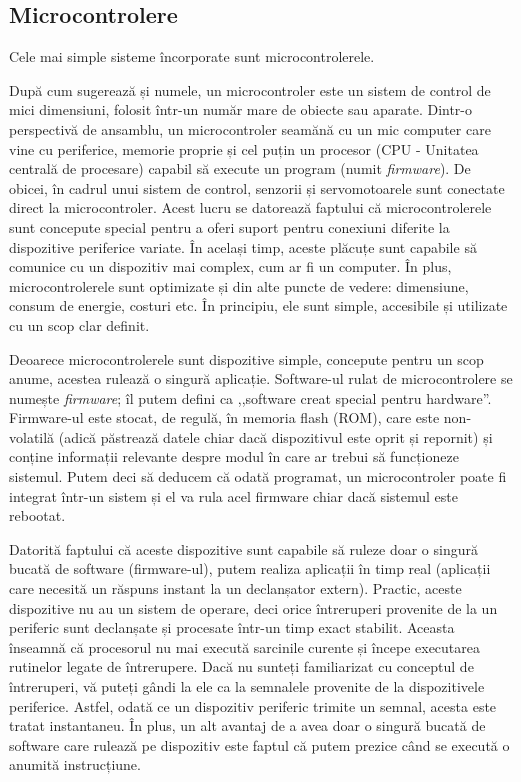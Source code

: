 \subsection{Microcontrolere}
\label{sec:embed:micro-comp:micro}

Cele mai simple sisteme încorporate sunt microcontrolerele.

După cum sugerează și numele, un microcontroler este un sistem de control de
mici dimensiuni, folosit într-un număr mare de obiecte sau aparate. Dintr-o
perspectivă de ansamblu, un microcontroler seamănă cu un mic computer care vine
cu periferice, memorie proprie și cel puțin un procesor (CPU - Unitatea centrală
de procesare) capabil să execute un program (numit \textit{firmware}). De obicei, în
cadrul unui sistem de control, senzorii și servomotoarele sunt conectate direct
la microcontroler. Acest lucru se datorează faptului că microcontrolerele sunt
concepute special pentru a oferi suport pentru conexiuni diferite la dispozitive
periferice variate. În același timp, aceste plăcuțe sunt capabile să comunice cu
un dispozitiv mai complex, cum ar fi un computer. În plus, microcontrolerele
sunt optimizate și din alte puncte de vedere: dimensiune, consum de energie,
costuri etc. În principiu, ele sunt simple, accesibile și utilizate cu un scop
clar definit.

Deoarece microcontrolerele sunt dispozitive simple, concepute pentru un scop
anume, acestea rulează o singură aplicație. Software-ul rulat de
microcontrolere se numește \textit{firmware}; îl putem defini ca ,,software creat special
pentru hardware''. Firmware-ul este stocat, de regulă, în memoria flash (ROM),
care este non-volatilă (adică păstrează datele chiar dacă dispozitivul este
oprit și repornit) și conține informații relevante despre modul în care ar
trebui să funcționeze sistemul. Putem deci să deducem că odată programat, un
microcontroler poate fi integrat într-un sistem și el va rula acel firmware
chiar dacă sistemul este rebootat.

Datorită faptului că aceste dispozitive sunt capabile să ruleze doar o singură
bucată de software (firmware-ul), putem realiza aplicații în timp real (aplicații
care necesită un răspuns instant la un declanșator extern). Practic, aceste
dispozitive nu au un sistem de operare, deci orice întreruperi provenite de la
un periferic sunt declanșate și procesate într-un timp exact stabilit. Aceasta
înseamnă că procesorul nu mai execută sarcinile curente și începe executarea
rutinelor legate de întrerupere. Dacă nu sunteți familiarizat cu conceptul de
întreruperi, vă puteți gândi la ele ca la semnalele provenite de la
dispozitivele periferice. Astfel, odată ce un dispozitiv periferic trimite un semnal,
acesta este tratat instantaneu. În plus, un alt avantaj de a avea doar o singură
bucată de software care rulează pe dispozitiv este faptul că putem prezice când
se execută o anumită instrucțiune.

